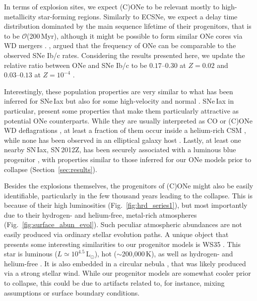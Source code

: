 \documentclass[main.tex]{subfiles}
\begin{document}
In terms of explosion sites, we expect (C)ONe \ias to be relevant mostly to high-metallicity star-forming regions. Similarly to ECSNe, we expect a delay time distribution dominated by the main sequence lifetime of their progenitors, that is to be $\mathcal{O}$(200\,Myr), although it might be possible to form similar ONe cores via WD mergers \citep{Schwab:2016lep}.
\cite{antoniadis2020}, argued that the frequency of ONe \ias can be comparable to the observed SNe Ib/c rates. Considering the results presented here, we update the relative ratio between ONe \ias and SNe Ib/c to be $\numrange{0.17}{0.30}$ at $Z=0.02$ and $\numrange{0.03}{0.13}$ at $Z=10^{-4}$ \citep[assuming a][initial mass function]{Chabrier:2004vw}.

Interestingly, these population properties are very similar to what has been inferred for SNe\,Iax \citep{Foley:2012tu,Meng:2017ijx,Jha:2017gwq} but also for some  high-velocity \citep[e.g.,][]{Pan:2020grt,Zeng:2021vsz} and normal \ias \citep{Maoz:2010pz,Soker:2021dii}. 
SNe\,Iax in particular, present some properties that make them particularly attractive as potential ONe \ia counterparts. While they are usually interpreted as CO or (C)ONe WD deflagrations \citep[e.g.,][]{Kromer:2015lda,Yamanaka:2015qpa,Magee:2016vnu},  at least a fraction of them occur inside a helium-rich CSM \citep{Magee:2018aui,Jacobson-Galan:2018fqu}, while none has been observed in an elliptical galaxy host \citep{Foley:2012tu}. 
Lastly, at least one nearby SN\,Iax, SN\,2012Z, has been securely associated with a luminous blue progenitor \citep{McCully:2014jva,Stritzinger:2014lva,Yamanaka:2015qpa,McCully:2021abc}, with properties similar to those inferred for our ONe models prior to collapse (Section~\ref{sec:results}). 

Besides the explosions themselves, the progenitors of (C)ONe \ias might also be easily identifiable, particularly in the few thousand years leading to the collapse. This is  because of their high luminosities (Fig.~\ref{fig:hrd_series1}), but most importantly due to their hydrogen- and helium-free, metal-rich atmospheres (Fig.~\ref{fig:surface_abun_evol}). Such peculiar atmospheric abundances are not easily produced via ordinary stellar evolution 
paths. A unique object that presents some interesting similarities to our progenitor models is WS35 \citep{Gvaramadze:2019abc,Oskinova:2019abc}. 
This star is luminous ($L\simeq 10^{4.5}$\,L$_{\odot}$), hot ($\sim$200,000\,K), as well as hydrogen- and helium-free \citep{Oskinova:2019abc}. It is also
embedded in a circular nebula \citep{Gvaramadze:2019abc}, that was likely produced via a
strong stellar wind. While our progenitor models  are somewhat cooler prior to collapse, this could be due to artifacts related to, for instance, mixing assumptions or surface boundary conditions.   
\end{document}
